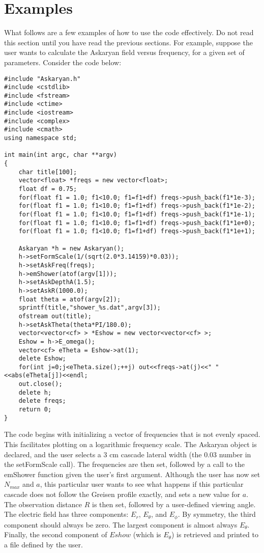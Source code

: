 \documentclass[10pt]{article}
\begin{document}
\section{Examples}

What follows are a few examples of how to use the code effectively.  Do not read this section until you have read the previous sections.  For example, suppose the user wants to calculate the Askaryan field versus frequency, for a given set of parameters.  Consider the code below:

\begin{verbatim}
#include "Askaryan.h"
#include <cstdlib>
#include <fstream>
#include <ctime>
#include <iostream>
#include <complex>
#include <cmath>
using namespace std;

int main(int argc, char **argv)
{
	char title[100];
	vector<float> *freqs = new vector<float>;
	float df = 0.75;
	for(float f1 = 1.0; f1<10.0; f1=f1+df) freqs->push_back(f1*1e-3);
	for(float f1 = 1.0; f1<10.0; f1=f1+df) freqs->push_back(f1*1e-2);
	for(float f1 = 1.0; f1<10.0; f1=f1+df) freqs->push_back(f1*1e-1);
	for(float f1 = 1.0; f1<10.0; f1=f1+df) freqs->push_back(f1*1e+0);
	for(float f1 = 1.0; f1<10.0; f1=f1+df) freqs->push_back(f1*1e+1);
	
	Askaryan *h = new Askaryan();
	h->setFormScale(1/(sqrt(2.0*3.14159)*0.03));
	h->setAskFreq(freqs);
	h->emShower(atof(argv[1]));
	h->setAskDepthA(1.5);
	h->setAskR(1000.0);
	float theta = atof(argv[2]);
	sprintf(title,"shower_%s.dat",argv[3]);
	ofstream out(title);
	h->setAskTheta(theta*PI/180.0);
	vector<vector<cf> > *Eshow = new vector<vector<cf> >;
	Eshow = h->E_omega();
	vector<cf> eTheta = Eshow->at(1);
	delete Eshow;
	for(int j=0;j<eTheta.size();++j) out<<freqs->at(j)<<" "<<abs(eTheta[j])<<endl;
	out.close();
	delete h;
	delete freqs;
	return 0;
}
\end{verbatim}

The code begins with initializing a vector of frequencies that is not evenly spaced.  This facilitates plotting on a logarithmic frequency scale.  The Askaryan object is declared, and the user selects a 3 cm cascade lateral width (the 0.03 number in the setFormScale call).  The frequencies are then set, followed by a call to the emShower function given the user's first argument.  Although the user has now set $N_{max}$ and $a$, this particular user wants to see what happens if this particular cascade does not follow the Greisen profile exactly, and sets a new value for $a$.  The observation distance $R$ is then set, followed by a user-defined viewing angle.  The electric field has three components: $E_r$, $E_\theta$, and $E_\phi$.  By symmetry, the third component should always be zero.  The largest component is almost always $E_\theta$.  Finally, the second component of $Eshow$ (which is $E_\theta$) is retrieved and printed to a file defined by the user.
\end{document}
